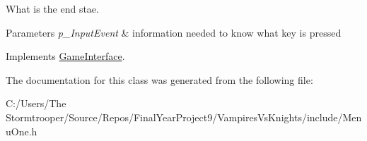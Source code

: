 What is the end stae. 


\begin{DoxyParams}{Parameters}
{\em p\+\_\+\+Input\+Event} & information needed to know what key is pressed \\
\hline
\end{DoxyParams}


Implements \mbox{\hyperlink{class_game_interface_a5bad60f237214cb1ec013e221ed16f45}{Game\+Interface}}.



The documentation for this class was generated from the following file\+:\begin{DoxyCompactItemize}
\item 
C\+:/\+Users/\+The Stormtrooper/\+Source/\+Repos/\+Final\+Year\+Project9/\+Vampires\+Vs\+Knights/include/Menu\+One.\+h\end{DoxyCompactItemize}
